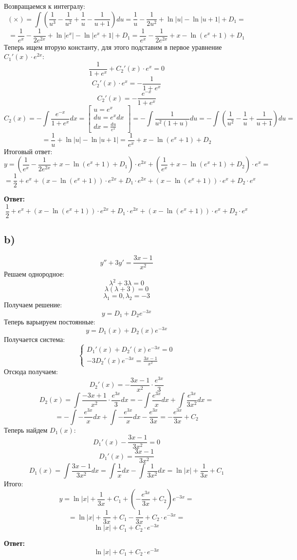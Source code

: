 \documentclass[a4paper,12pt]{article}
\begin{document}
Возвращаемся к интегралу:
\[
(\times)  =
 \int \left( 
\frac{1}{u^3} - \frac{1}{u^2} +  \frac{1}{u} - \frac{1}{u + 1} 
\right)du 
=  \frac{1}{u} - \frac{1}{2u^2}  +  \ln |u| -  \ln |u + 1| + D_1= 
\]
\[
=
\frac{1}{e^{x}} - \frac{1}{2e^{2x}} + \ln |e^x| - \ln|e^x + 1| + D_1 = \frac{1}{e^{x}} - \frac{1}{2e^{2x}} + x - \ln(e^x + 1)+ D_1
\]
Теперь ищем вторую константу, для этого подставим в первое уравнение $C_1'(x) \cdot e^{2x}$:
\[
 \frac{1}{1 + e^x} + C_2'(x) \cdot e^{x}= 0 
\]
\[
C_2'(x) \cdot e^{x} = -  \frac{1}{1 + e^x}
\]
\[
C_2'(x) = - \frac{e^{-x}}{1 + e^x}
\]
\[
C_2(x) = - \int  \frac{e^{-x}}{1 + e^x}dx = \begin{bmatrix}
u = e^x \\
du = e^x dx \\
dx = \frac{du}{e^{x}}
\end{bmatrix} = - \int \frac{1}{u^2(1 + u)}du = - \int \left( \frac{1}{u^2} - \frac{1}{u} + \frac{1}{u + 1}\right) du   =
\]
\[
=
 \frac{1}{u}  + \ln |u|- \ln|u + 1| = \frac{1}{e^x} + x - \ln(e^x + 1)+ D_2
\]
Итоговый ответ:
\[
y = \left(\frac{1}{e^{x}} - \frac{1}{2e^{2x}} + x- \ln(e^x + 1)+ D_1\right) \cdot e^{2x} + \left( \frac{1}{e^x} + x - \ln(e^x + 1)+ D_2\right) \cdot e^{x} = 
\]
\[
=
\frac{1}{2} + e^x + (x - \ln(e^x + 1)) \cdot e^{2x}  + D_1 \cdot e^{2x}+ (x - \ln(e^x + 1)) \cdot e^x + D_2 \cdot e^x
\]
\begin{center}
\textbf{Ответ: } 
\[
\frac{1}{2} + e^x + (x - \ln(e^x + 1)) \cdot e^{2x}  + D_1 \cdot e^{2x}+ (x - \ln(e^x + 1)) \cdot e^x + D_2 \cdot e^x
\]
\end{center}
\clearpage
\subsection*{b)}
\[
y'' + 3y' = \frac{3x - 1}{x^2}
\]
Решаем однородное:
\[
\lambda^2+ 3 \lambda = 0
\]
\[
\lambda(\lambda + 3) = 0
\]
\[
\lambda_1 = 0, \lambda_2 = -3
\]
Получаем решение:
\[
y = D_1+ D_2 e^{-3x}
\]
Теперь варьируем постоянные:
\[
y = D_1(x) + D_2(x) e^{-3x}
\]
Получается система:
\[
\begin{cases}
D_1'(x) + D_2'(x) e^{-3x} = 0 \\
-3 D_2'(x) e^{-3x} = \frac{3x - 1}{x^2}
\end{cases}
\]
Отсюда получаем:
\[
D_2'(x) = -\frac{3x - 1}{x^2} \cdot \frac{e^{3x}}{3}
\]
\[
D_2(x) = \int \frac{-3x + 1}{x^2} \cdot \frac{e^{3x}}{3} dx= -\int \frac{e^{3x}}{x}  dx+ \int \frac{e^{3x}}{3x^2} dx =
\]
\[
=
- \int -\frac{e^{3x}}{x} dx + \int - \frac{e^{3x}}{x} dx -\frac{e^{3x}}{3x}  = -\frac{e^{3x}}{3x}  + C_2
\]
Теперь найдем $D_1(x)$:
\[
D_1'(x) - \frac{3x-1}{3x^2} = 0
\]
\[
D_1'(x)  =  \frac{3x-1}{3x^2} 
\]
\[
D_1(x) = \int   \frac{3x-1}{3x^2} dx = \int \frac{1}{x} dx - \int \frac{1}{3x^2}dx = \ln |x| + \frac{1}{3x} + C_1
\]
Итого:
\[
y = \ln |x| + \frac{1}{3x} + C_1 + \left(-\frac{e^{3x}}{3x} + C_2\right) e^{-3x} = 
\]
\[
=
\ln |x| + \frac{1}{3x} + C_1  - \frac{1}{3x} + C_2 \cdot e^{-3x} = 
\] 
\[
\ln |x| + C_1 + C_2 \cdot e^{-3x}
\]
\begin{center}
\textbf{Ответ: } 
\[
\ln |x| + C_1 + C_2 \cdot e^{-3x}
\]
\end{center}
\clearpage
\end{document}
